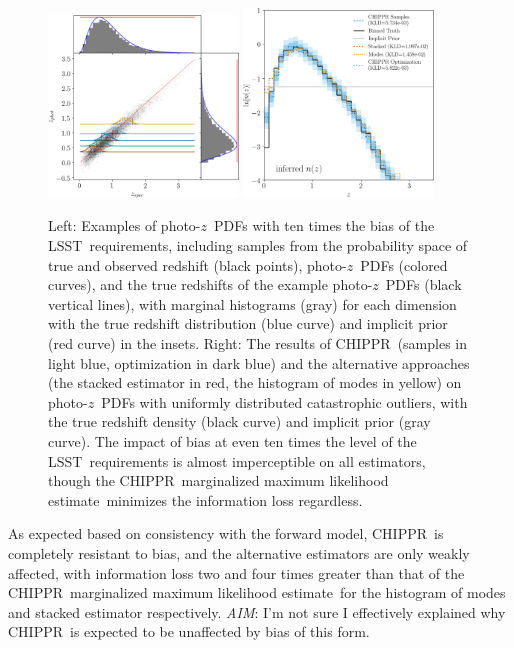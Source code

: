 \documentclass[iop]{emulateapj}
\newcommand{\todo}[3]{{\color{#2}\emph{#1}: #3}}
\newcommand{\aim}[1]{\todo{AIM}{red}{#1}}
\newcommand{\project}[1]{{\textsc{#1}}}
\newcommand{\lsst}{\project{LSST}}
\newcommand{\Chippr}{\project{CHIPPR}}
\newcommand{\pz}{photo-$z$~}
\newcommand{\pzpdf}{\pz PDF}
\newcommand{\mmle}{marginalized maximum likelihood estimate}
\begin{document}
\begin{figure}
	\begin{center}
	\includegraphics[width=0.45\textwidth]{figures/chippr/thesis_neghivarbias_mega_scatter.png}
	\includegraphics[width=0.45\textwidth]{figures/chippr/thesis_neghivarbias_log_estimators.png}
	\caption{
		Left: Examples of \pzpdf s with ten times the bias of the \lsst\ requirements, including samples from the probability space of true and observed redshift (black points), \pzpdf s (colored curves), and the true redshifts of the example \pzpdf s (black vertical lines), with marginal histograms (gray) for each dimension with the true redshift distribution (blue curve) and implicit prior (red curve) in the insets.
		Right: The results of \Chippr\ (samples in light blue, optimization in dark blue) and the alternative approaches (the stacked estimator in red, the histogram of modes in yellow) on \pzpdf s with uniformly distributed catastrophic outliers, with the true redshift density (black curve) and implicit prior (gray curve).
		The impact of bias at even ten times the level of the \lsst\ requirements is almost imperceptible on all estimators, though the \Chippr\ \mmle\ minimizes the information loss regardless.
	}
	\label{fig:bias}
	\end{center}
\end{figure}

As expected based on consistency with the forward model, \Chippr\ is completely resistant to bias, and the alternative estimators are only weakly affected, with information loss two and four times greater than that of the \Chippr\ \mmle\ for the histogram of modes and stacked estimator respectively.
\aim{I'm not sure I effectively explained why \Chippr\ is expected to be unaffected by bias of this form.}
\end{document}
